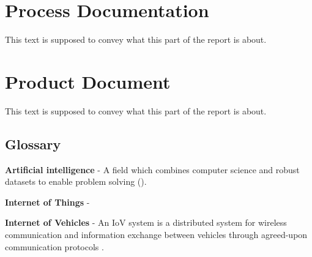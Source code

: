 \documentclass[14pt, a4paper, english]{report}
\begin{document}
	\part{Process Documentation}
	This text is supposed to convey what this part of the report is about.
	
	
	
	\part{Product Document}
	This text is supposed to convey what this part of the report is about.
	
%	

	
%	
%	
%	
	
	\chapter*{Glossary}
	
	\textbf{Artificial intelligence} - A field which combines computer science and robust datasets to enable problem solving (\cite{artificial_intelligence}).
	
	\textbf{Internet of Things} -
	
	\textbf{Internet of Vehicles} - An IoV system is a distributed system for wireless communication and information exchange between vehicles through agreed-upon communication protocols \parencite{chinese_iov}.
	
	
	
	\clearpage
    \printbibliography
    \appendix
    
    
    
\end{document}
